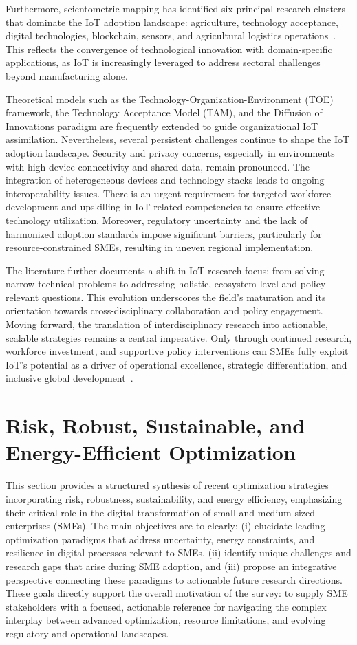 \documentclass[sigconf]{acmart}
\begin{document}
Furthermore, scientometric mapping has identified six principal research clusters that dominate the IoT adoption landscape: agriculture, technology acceptance, digital technologies, blockchain, sensors, and agricultural logistics operations~\cite{ref33}. This reflects the convergence of technological innovation with domain-specific applications, as IoT is increasingly leveraged to address sectoral challenges beyond manufacturing alone.

Theoretical models such as the Technology-Organization-Environment (TOE) framework, the Technology Acceptance Model (TAM), and the Diffusion of Innovations paradigm are frequently extended to guide organizational IoT assimilation. Nevertheless, several persistent challenges continue to shape the IoT adoption landscape. Security and privacy concerns, especially in environments with high device connectivity and shared data, remain pronounced. The integration of heterogeneous devices and technology stacks leads to ongoing interoperability issues. There is an urgent requirement for targeted workforce development and upskilling in IoT-related competencies to ensure effective technology utilization. Moreover, regulatory uncertainty and the lack of harmonized adoption standards impose significant barriers, particularly for resource-constrained SMEs, resulting in uneven regional implementation.

The literature further documents a shift in IoT research focus: from solving narrow technical problems to addressing holistic, ecosystem-level and policy-relevant questions. This evolution underscores the field’s maturation and its orientation towards cross-disciplinary collaboration and policy engagement. Moving forward, the translation of interdisciplinary research into actionable, scalable strategies remains a central imperative. Only through continued research, workforce investment, and supportive policy interventions can SMEs fully exploit IoT’s potential as a driver of operational excellence, strategic differentiation, and inclusive global development~\cite{ref33}.

\section{Risk, Robust, Sustainable, and Energy-Efficient Optimization}

This section provides a structured synthesis of recent optimization strategies incorporating risk, robustness, sustainability, and energy efficiency, emphasizing their critical role in the digital transformation of small and medium-sized enterprises (SMEs). The main objectives are to clearly: (i) elucidate leading optimization paradigms that address uncertainty, energy constraints, and resilience in digital processes relevant to SMEs, (ii) identify unique challenges and research gaps that arise during SME adoption, and (iii) propose an integrative perspective connecting these paradigms to actionable future research directions. These goals directly support the overall motivation of the survey: to supply SME stakeholders with a focused, actionable reference for navigating the complex interplay between advanced optimization, resource limitations, and evolving regulatory and operational landscapes.
\end{document}
